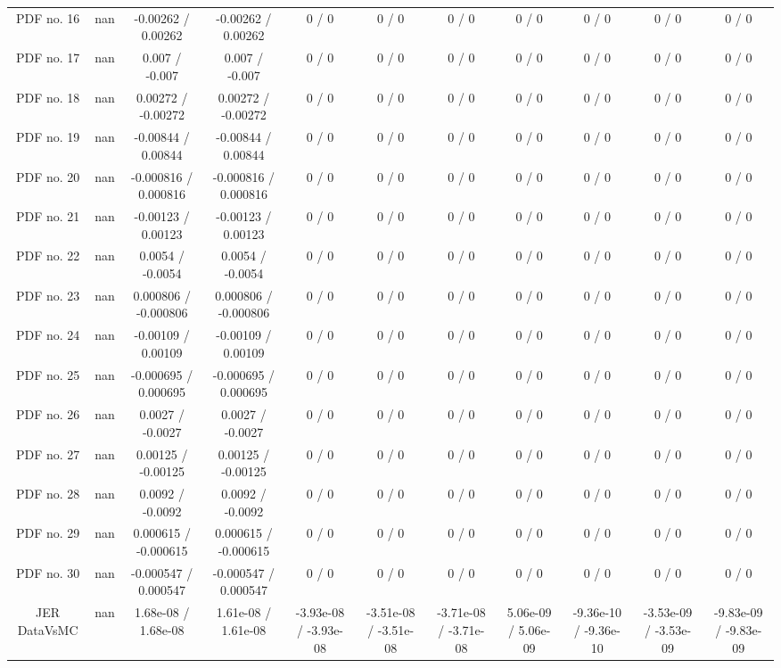 \begin{table}[htbp]
\begin{center}
\begin{tabular}{|c|c|c|c|c|c|c|c|c|c|c|}
  PDF no. 16 &    nan    & -0.00262 / 0.00262 & -0.00262 / 0.00262 & 0 / 0 & 0 / 0 & 0 / 0 & 0 / 0 & 0 / 0 & 0 / 0 & 0 / 0 \\ 
  PDF no. 17 &    nan    & 0.007 / -0.007 & 0.007 / -0.007 & 0 / 0 & 0 / 0 & 0 / 0 & 0 / 0 & 0 / 0 & 0 / 0 & 0 / 0 \\ 
  PDF no. 18 &    nan    & 0.00272 / -0.00272 & 0.00272 / -0.00272 & 0 / 0 & 0 / 0 & 0 / 0 & 0 / 0 & 0 / 0 & 0 / 0 & 0 / 0 \\ 
  PDF no. 19 &    nan    & -0.00844 / 0.00844 & -0.00844 / 0.00844 & 0 / 0 & 0 / 0 & 0 / 0 & 0 / 0 & 0 / 0 & 0 / 0 & 0 / 0 \\ 
  PDF no. 20 &    nan    & -0.000816 / 0.000816 & -0.000816 / 0.000816 & 0 / 0 & 0 / 0 & 0 / 0 & 0 / 0 & 0 / 0 & 0 / 0 & 0 / 0 \\ 
  PDF no. 21 &    nan    & -0.00123 / 0.00123 & -0.00123 / 0.00123 & 0 / 0 & 0 / 0 & 0 / 0 & 0 / 0 & 0 / 0 & 0 / 0 & 0 / 0 \\ 
  PDF no. 22 &    nan    & 0.0054 / -0.0054 & 0.0054 / -0.0054 & 0 / 0 & 0 / 0 & 0 / 0 & 0 / 0 & 0 / 0 & 0 / 0 & 0 / 0 \\ 
  PDF no. 23 &    nan    & 0.000806 / -0.000806 & 0.000806 / -0.000806 & 0 / 0 & 0 / 0 & 0 / 0 & 0 / 0 & 0 / 0 & 0 / 0 & 0 / 0 \\ 
  PDF no. 24 &    nan    & -0.00109 / 0.00109 & -0.00109 / 0.00109 & 0 / 0 & 0 / 0 & 0 / 0 & 0 / 0 & 0 / 0 & 0 / 0 & 0 / 0 \\ 
  PDF no. 25 &    nan    & -0.000695 / 0.000695 & -0.000695 / 0.000695 & 0 / 0 & 0 / 0 & 0 / 0 & 0 / 0 & 0 / 0 & 0 / 0 & 0 / 0 \\ 
  PDF no. 26 &    nan    & 0.0027 / -0.0027 & 0.0027 / -0.0027 & 0 / 0 & 0 / 0 & 0 / 0 & 0 / 0 & 0 / 0 & 0 / 0 & 0 / 0 \\ 
  PDF no. 27 &    nan    & 0.00125 / -0.00125 & 0.00125 / -0.00125 & 0 / 0 & 0 / 0 & 0 / 0 & 0 / 0 & 0 / 0 & 0 / 0 & 0 / 0 \\ 
  PDF no. 28 &    nan    & 0.0092 / -0.0092 & 0.0092 / -0.0092 & 0 / 0 & 0 / 0 & 0 / 0 & 0 / 0 & 0 / 0 & 0 / 0 & 0 / 0 \\ 
  PDF no. 29 &    nan    & 0.000615 / -0.000615 & 0.000615 / -0.000615 & 0 / 0 & 0 / 0 & 0 / 0 & 0 / 0 & 0 / 0 & 0 / 0 & 0 / 0 \\ 
  PDF no. 30 &    nan    & -0.000547 / 0.000547 & -0.000547 / 0.000547 & 0 / 0 & 0 / 0 & 0 / 0 & 0 / 0 & 0 / 0 & 0 / 0 & 0 / 0 \\ 
  JER DataVsMC &    nan    & 1.68e-08 / 1.68e-08 & 1.61e-08 / 1.61e-08 & -3.93e-08 / -3.93e-08 & -3.51e-08 / -3.51e-08 & -3.71e-08 / -3.71e-08 & 5.06e-09 / 5.06e-09 & -9.36e-10 / -9.36e-10 & -3.53e-09 / -3.53e-09 & -9.83e-09 / -9.83e-09 \\ 

\end{tabular}
\end{center}
\end{table}
